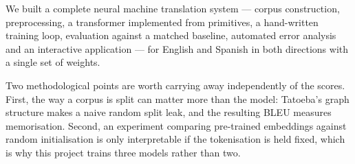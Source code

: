 \documentclass[11pt,a4paper]{article}
\begin{document}
We built a complete neural machine translation system --- corpus construction,
preprocessing, a transformer implemented from primitives, a hand-written
training loop, evaluation against a matched baseline, automated error analysis
and an interactive application --- for English and Spanish in both directions
with a single set of weights.

Two methodological points are worth carrying away independently of the scores.
First, the way a corpus is split can matter more than the model: Tatoeba's
graph structure makes a naive random split leak, and the resulting BLEU
measures memorisation. Second, an experiment comparing pre-trained embeddings
against random initialisation is only interpretable if the tokenisation is held
fixed, which is why this project trains three models rather than two.
\end{document}

